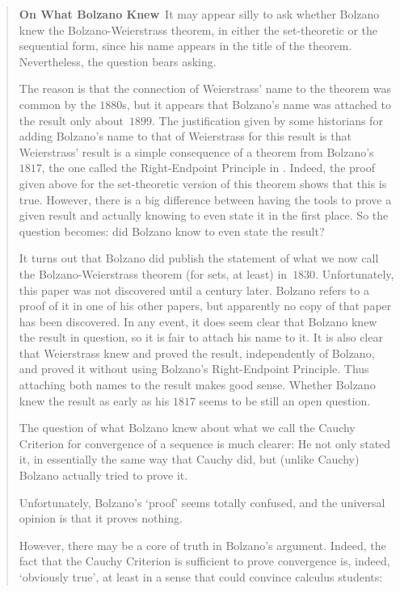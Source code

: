 \begin{quotation}
{\VV

        {\bf On What Bolzano Knew}\, It may appear silly to ask whether Bolzano knew the Bolzano-Weierstrass theorem,
    in either the set-theoretic or the sequential form, since his name appears in the title of the theorem. Nevertheless, the question bears asking.

        The reason is that the connection of Weierstrass' name to the theorem was common by the $1880$s,
    but it appears that Bolzano's name was attached to the result only about~$1899$.
    The justification given by some historians for adding Bolzano's name to that of Weierstrass for this result is that
    Weierstrass' result is a simple consequence of a theorem from Bolzano's $1817$, the one called the Right-Endpoint Principle in {\ThisText}.
    Indeed, the proof given above for the set-theoretic version of this theorem shows that this is true.
    However, there is a big difference between having the tools to prove a given result and actually knowing to even state it in the first place.
    So the question becomes: did Bolzano know to even state the result?

        It turns out that Bolzano did publish the statement of what we now call the Bolzano-Weierstrass theorem (for sets, at least) in~$1830$. Unfortunately, 
    this paper was not discovered until a century later. Bolzano refers to a proof of it in one of his other papers,
    but apparently no copy of that paper has been discovered. In any event, it does seem clear that Bolzano knew the result in question,
    so it is fair to attach his name to it. It is also clear that Weierstrass knew and proved the result,
    independently of Bolzano, and proved it without using Bolzano's Right-Endpoint Principle.
    Thus attaching both names to the result makes good sense. Whether Bolzano knew the result as early as his $1817$ seems to be still an open question.

\V

        The question of what Bolzano knew about what we call the Cauchy Criterion for convergence of a sequence is much clearer:
    He not only stated it, in essentially the same way that Cauchy did, but (unlike Cauchy) Bolzano actually tried to prove it.   

        Unfortunately, Bolzano's `proof' seems totally confused, and the universal opinion is that it proves nothing.

    However, there may be a core of truth in Bolzano's argument. Indeed, the fact that the Cauchy Criterion is sufficient to prove convergence is,
    indeed, `obviously true', at least in a sense that could convince calculus students:

}
\end{quotation}
